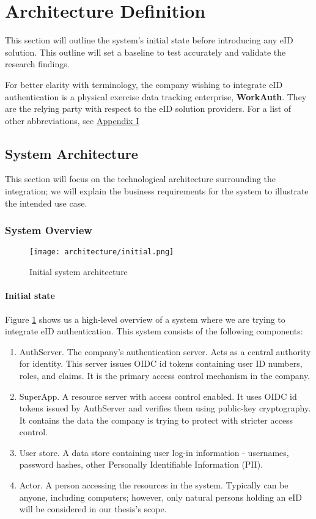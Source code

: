 \section{Architecture Definition}

This section will outline the system's initial state before introducing any eID solution. This outline will set a baseline to test accurately and validate the research findings.

For better clarity with terminology, the company wishing to integrate eID authentication is a physical exercise data tracking enterprise, \textbf{WorkAuth}. They are the relying party with respect to the eID solution providers. For a list of other abbreviations, see \hyperref[appendix:glossary]{Appendix I}

\subsection{System Architecture}

This section will focus on the technological architecture surrounding the integration; we will explain the business requirements for the system to illustrate the intended use case.

\subsubsection{System Overview}

\begin{figure}
  \centering
  \texttt{[image: architecture/initial.png]}
  \caption{Initial system architecture}
  \label{fig:sys-highlevel}
\end{figure}

\paragraph{Initial state}

Figure \ref{fig:sys-highlevel} shows us a high-level overview of a system where we are trying to integrate eID authentication. This system consists of the following components:

\begin{enumerate}
  \item AuthServer. The company's authentication server. Acts as a central authority for identity. This server issues OIDC id tokens containing user ID numbers, roles, and claims. It is the primary access control mechanism in the company.
  \item SuperApp. A resource server with access control enabled. It uses OIDC id tokens issued by AuthServer and verifies them using public-key cryptography. It contains the data the company is trying to protect with stricter access control.
  \item User store. A data store containing user log-in information - usernames, password hashes, other Personally Identifiable Information (PII).
  \item Actor. A person accessing the resources in the system. Typically can be anyone, including computers; however, only natural persons holding an eID will be considered in our thesis's scope.
\end{enumerate}

